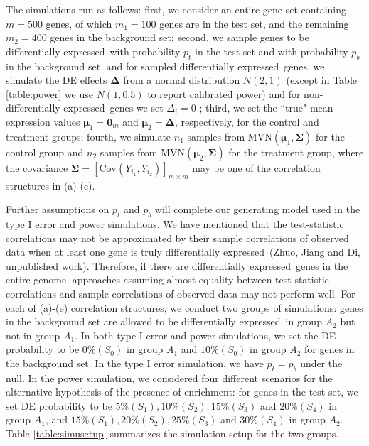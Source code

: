 \documentclass[a4,center,fleqn]{NAR}
\newcommand{\aaCase}{a}
\newcommand{\fCase}{e}
\newcommand{\thepapertobefinished}{Zhuo, Jiang and Di, unpublished work}
\newcommand{\DED}{differentially expressed}
\begin{document}
	The simulations run as follows: first, we consider an entire gene set containing $m=500$ genes,
	of which $m_1 = 100$ genes are in the test set, and the
	remaining $m_2=400$ genes in the background set; second, we sample genes to be \DED~with 
	probability $p_t$ in the test set and with probability $p_b$ in the background set, and for 
	sampled \DED~genes, we simulate the DE effects $\bm \Delta$ from  a normal distribution $N(2, 
	1)$ (except in Table \ref{table:power} we use $N(1, 0.5)$ to report calibrated power) and for 
	non-\DED~genes we set $\Delta_i= 0$ ; third, we set the ``true" mean expression values $\bm 
	\mu_1 
	= \bm 0_m$ and $\bm \mu_2 = \bm \Delta$, respectively, for the control and treatment groups; 
	fourth, we simulate $n_1$ samples from $\text{MVN}(\bm \mu_1, \bm \Sigma)$ for the control 
	group and $n_2$ samples from $\text{MVN}(\bm \mu_2, \bm \Sigma)$ for
	the treatment group, where the covariance $\bm \Sigma = \left[\text{Cov}(Y_{i_1},
	Y_{i_2})\right]_{m\times m}$ may be one of the correlation structures in (\aaCase)-(\fCase).
	
	Further assumptions on $p_t$ and $p_b$ will complete our generating model used in the type I 
	error and power simulations. %
	We have mentioned that the test-statistic correlations may not be approximated by their sample 
	correlations of observed data when at least one gene is truly \DED~(\thepapertobefinished). 
	Therefore, if there are \DED~genes in the entire genome, 
	approaches assuming	almost equality between test-statistic correlations and sample correlations 
	of observed-data may not perform well. For each of (\aaCase)-(\fCase) correlation 
	structures, we conduct two groups of simulations: genes in the background set are allowed to be 
	\DED~in group $A_2$ but not in group $A_1$.  In both type I error and power 
	simulations, we set the DE probability to be $0\%(S_0)$ in group $A_1$ and $10\%(S_0)$ in group 
	$A_2$ for genes in the background set. In the type I error simulation, we have $p_t = p_b$ 
	under the null. In the power simulation, we considered four different scenarios for the 
	alternative hypothesis of the presence of enrichment: for genes in the test set, we set DE
	probability to be $5\% (S_1), 10\%(S_2), 15\%(S_3)$ and $20\%(S_4)$ in group $A_1$, and 
	$15\%(S_1),	20\%(S_2), 25\%(S_3)$ and $30\%(S_4)$ in group $A_2$. Table \ref{table:simusetup} 
	summarizes the simulation setup for the two groups.
	
\end{document}
